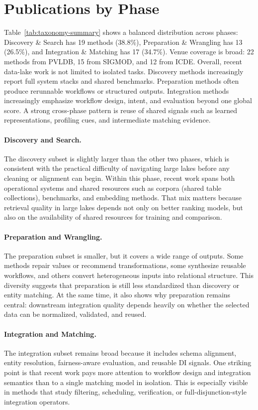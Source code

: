 \documentclass[sigconf,nonacm]{acmart}
\begin{document}
\section{Publications by Phase}
\label{sec:pubs-by-phase}

Table~\ref{tab:taxonomy-summary} shows a balanced distribution across phases: Discovery \& Search has 19 methods (38.8\%), Preparation \& Wrangling has 13 (26.5\%), and Integration \& Matching has 17 (34.7\%). Venue coverage is broad: 22 methods from PVLDB, 15 from SIGMOD, and 12 from ICDE. Overall, recent data-lake work is not limited to isolated tasks. Discovery methods increasingly report full system stacks and shared benchmarks. Preparation methods often produce rerunnable workflows or structured outputs. Integration methods increasingly emphasize workflow design, intent, and evaluation beyond one global score. A strong cross-phase pattern is reuse of shared signals such as learned representations, profiling cues, and intermediate matching evidence.

\paragraph{Discovery and Search.}
The discovery subset is slightly larger than the other two phases, which is consistent with the practical difficulty of navigating large lakes before any cleaning or alignment can begin. Within this phase, recent work spans both operational systems and shared resources such as corpora (shared table collections), benchmarks, and embedding methods. That mix matters because retrieval quality in large lakes depends not only on better ranking models, but also on the availability of shared resources for training and comparison.

\paragraph{Preparation and Wrangling.}
The preparation subset is smaller, but it covers a wide range of outputs. Some methods repair values or recommend transformations, some synthesize reusable workflows, and others convert heterogeneous inputs into relational structure. This diversity suggests that preparation is still less standardized than discovery or entity matching. At the same time, it also shows why preparation remains central: downstream integration quality depends heavily on whether the selected data can be normalized, validated, and reused.

\paragraph{Integration and Matching.}
The integration subset remains broad because it includes schema alignment, entity resolution, fairness-aware evaluation, and reusable DI signals. One striking point is that recent work pays more attention to workflow design and integration semantics than to a single matching model in isolation. This is especially visible in methods that study filtering, scheduling, verification, or full-disjunction-style integration operators.
\end{document}
